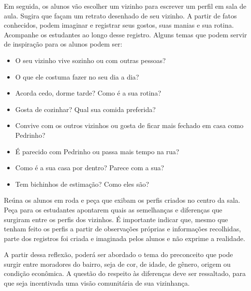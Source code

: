 \documentclass[11pt]{extarticle}
\begin{document}

Em seguida, os alunos vão escolher um vizinho para escrever um perfil em sala de aula. Sugira que façam um retrato desenhado de seu vizinho. A partir de fatos conhecidos, podem imaginar e registrar seus gostos, suas manias e sua rotina. Acompanhe os estudantes ao longo desse registro. Alguns temas que podem servir de inspiração para os alunos podem ser:

\begin{itemize} 

\item O seu vizinho vive sozinho ou com outras pessoas?

\item O que ele costuma fazer no seu dia a dia?

\item Acorda cedo, dorme tarde? Como é a sua rotina?

\item Gosta de cozinhar? Qual sua comida preferida?

\item Convive com os outros vizinhos ou gosta de ficar mais fechado em casa como Pedrinho?

\item É parecido com Pedrinho ou passa mais tempo na rua?

\item Como é a sua casa por dentro? Parece com a sua?

\item Tem bichinhos de estimação? Como eles são?

\end{itemize}

Reúna os alunos em roda e peça que exibam os perfis criados no centro da sala. Peça para os estudantes apontarem quais as semelhanças e diferenças que surgiram entre os perfis dos vizinhos. É importante indicar que, mesmo que tenham feito os perfis a partir de observações próprias e informações recolhidas, parte dos registros foi criada e imaginada pelos alunos e não exprime a realidade.

A partir dessa reflexão, poderá ser abordado o tema do preconceito que pode surgir entre moradores do bairro, seja de cor, de idade, de gênero, origem ou condição econômica. A questão do respeito às diferenças deve ser ressaltado, para que seja incentivada uma visão comunitária de sua vizinhança.
\end{document}
